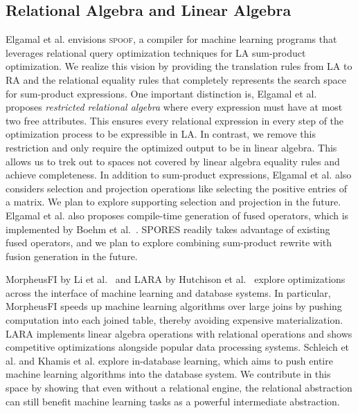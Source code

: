 \subsection{Relational Algebra and Linear Algebra}
Elgamal et al. \cite{ElgamalLBETRS17} envisions \textsc{spoof}, a compiler for machine learning programs
that leverages relational query optimization techniques for LA sum-product optimization. 
We realize this vision by providing the translation
rules from LA to RA and the relational equality rules that completely represents
the search space for sum-product expressions. One important distinction is, Elgamal
et al. proposes \emph{restricted relational algebra} where every expression must
have at most two free attributes. This ensures every relational expression in every step of the
optimization process to be expressible in LA. In contrast, we remove this restriction and only require the 
optimized output to be in linear algebra. This allows us to trek out to spaces not
covered by linear algebra equality rules and achieve completeness. In addition 
to sum-product expressions, Elgamal et al. also considers selection and projection operations
like selecting the positive entries of a matrix. We plan to explore supporting
selection and projection in the future. Elgamal et al. also proposes compile-time generation of
fused operators, which is implemented by Boehm et al.~\cite{DBLP:journals/pvldb/BoehmRHSEP18}.
SPORES readily takes advantage of existing fused operators, and we
plan to explore combining sum-product rewrite with fusion generation in the future. 

MorpheusFI by Li et al.~\cite{DBLP:conf/sigmod/LiC019} and LARA by Hutchison et al.~\cite{DBLP:journals/corr/HutchisonHS17} explore optimizations across the interface of machine learning and database systems. In particular, MorpheusFI speeds up machine learning algorithms over large joins by pushing computation into each joined table, thereby avoiding expensive
materialization. LARA implements linear algebra operations with relational operations and
shows competitive optimizations alongside popular data processing systems. 
Schleich et al.\cite{DBLP:conf/sigmod/SchleichOC16} and Khamis et al.\cite{DBLP:journals/corr/NgoNOS17} explore in-database learning, which aims to push entire
machine learning algorithms into the database system. 
We contribute in this space by showing that even without a relational engine, the
relational abstraction can still benefit machine learning tasks as a powerful
intermediate abstraction. 

